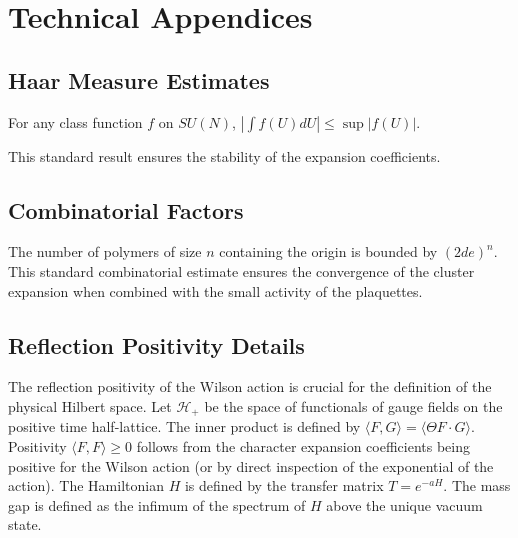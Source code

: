 
\section{Technical Appendices}
\label{sec:appendices_app145}

\subsection{Haar Measure Estimates}
\begin{lemma}
For any class function $f$ on $SU(N)$, $|\int f(U) dU| \le \sup |f(U)|$.
\end{lemma}
This standard result ensures the stability of the expansion coefficients.

\subsection{Combinatorial Factors}
The number of polymers of size $n$ containing the origin is bounded by $(2d e)^n$. This standard combinatorial estimate ensures the convergence of the cluster expansion when combined with the small activity of the plaquettes.

\subsection{Reflection Positivity Details}
The reflection positivity of the Wilson action is crucial for the definition of the physical Hilbert space.
Let $\mathcal{H}_+$ be the space of functionals of gauge fields on the positive time half-lattice.
The inner product is defined by $\langle F, G \rangle = \langle \Theta F \cdot G \rangle$.
Positivity $\langle F, F \rangle \ge 0$ follows from the character expansion coefficients being positive for the Wilson action (or by direct inspection of the exponential of the action).
The Hamiltonian $H$ is defined by the transfer matrix $T = e^{-a H}$.
The mass gap is defined as the infimum of the spectrum of $H$ above the unique vacuum state.



